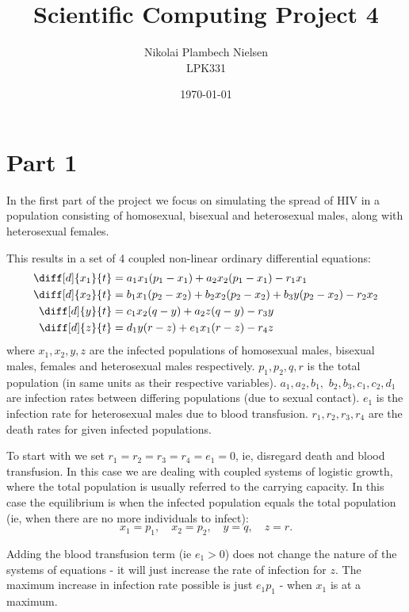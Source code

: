 \documentclass[a4paper,10pt]{article}
\title{Scientific Computing Project 4}
\author{Nikolai Plambech Nielsen\\LPK331}
\date{\today}
\begin{document}
	\maketitle
	\section*{Part 1}
	In the first part of the project we focus on simulating the spread of HIV in a population consisting of homosexual, bisexual and heterosexual males, along with heterosexual females.
	
	This results in a set of 4 coupled non-linear ordinary differential equations:
	\begin{align}
		\diff[d]{x_1}{t} &= a_1 x_1 (p_1-x_1) + a_2 x_2 ( p_1-x_1) - r_1 x_1 \\
		\diff[d]{x_2}{t} &= b_1 x_1 (p_2-x_2) + b_2 x_2 ( p_2-x_2) +  b_3 y(p_2-x_2) - r_2 x_2 \\
		\diff[d]{y}{t} &= c_1 x_2 (q-y) + a_2 z (q-y) - r_3 y \\
		\diff[d]{z}{t} &= d_1 y (r-z) + e_1 x_1 (r-z) - r_4 z	
	\end{align}
	where $ x_1, x_2, y, z $ are the infected populations of homosexual males, bisexual males, females and heterosexual males respectively. $ p_1, p_2, q, r $ is the total population (in same units as their respective variables). $ a_1, a_2, b_1,$ $ b_2, b_3, c_1, c_2, d_1 $ are infection rates between differing populations (due to sexual contact). $ e_1 $ is the infection rate for heterosexual males due to blood transfusion. $ r_1, r_2, r_3, r_4 $ are the death rates for given infected populations.
	
	To start with we set $ r_1 = r_2 = r_3 = r_4 = e_1 = 0$, ie, disregard death and blood transfusion. In this case we are dealing with coupled systems of logistic growth, where the total population is usually referred to the carrying capacity. In this case the equilibrium is when the infected population equals the total population (ie, when there are no more individuals to infect):
	\begin{equation}\label{key}
		x_1 = p_1, \quad x_2=p_2, \quad y=q, \quad z=r.
	\end{equation}
	
	Adding the blood transfusion term (ie $ e_1 > 0 $) does not change the nature of the systems of equations - it will just increase the rate of infection for $ z $. The maximum increase in infection rate possible is just $ e_1p_1 $ - when $ x_1 $ is at a maximum.
	
\end{document}
